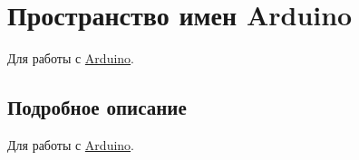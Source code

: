 \hypertarget{namespaceArduino}{}\section{Пространство имен Arduino}
\label{namespaceArduino}


Для работы с \hyperlink{namespaceArduino}{Arduino}.  




\subsection{Подробное описание}
Для работы с \hyperlink{namespaceArduino}{Arduino}. 